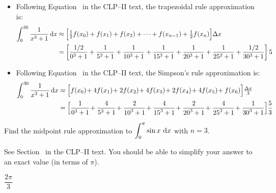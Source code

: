 \begin{solution}
\begin{itemize}
 \item
  Following Equation~ in the CLP--II text, the trapezoidal rule approximation is:
\begin{align*}
\int_0^{30} \frac{1}{x^3+1}\,\mathrm{d}x
&\approx\Big[\tfrac{1}{2} f(x_0)+f(x_1)+f(x_2)+\cdots+ f(x_{n-1})+\tfrac{1}{2} f(x_n)\Big]\Delta x\\
&=\left[
\frac{1/2}{0^3+1}+
\frac{1}{5^3+1}+
\frac{1}{10^3+1}+
\frac{1}{15^3+1}+
\frac{1}{20^3+1}+
\frac{1}{25^3+1}+
\frac{1/2}{30^3+1}
\right]5
\end{align*}

\item Following Equation~ in the CLP--II text, the Simpson's rule approximation is:
\begin{align*}
\int_0^{30} \frac{1}{x^3+1}\,\dee{x}
&\approx\Big[f(x_0)\!+4f(x_1)\!+2f(x_2)\!+4f(x_3)\!+2f(x_4)\!+4f(x_{5})\!+ f(x_6)\Big]\tfrac{\De x}{3}\\
&=\Big[\frac{1}{{0}^3+1}\!+\frac{4}{{5}^3+1}\!+\frac{2}{{10}^3+1}\!+\frac{4}{{15}^3+1}\!+\frac{2}{{20}^3+1}\!+\frac{4}{{25}^3+1}\!+ \frac{1}{{30}^3+1}\Big]\frac{5}{3}
\end{align*}

\end{itemize}
\end{solution}


\begin{question}[M121 2012A]\label{prob_s1.11_int2}
Find the midpoint rule approximation to $\displaystyle\int_0^\pi \sin x\ \mathrm{d}x$
with $n = 3$.
\end{question}

\begin{hint}
See Section~ in the
CLP--II text. You should be able to simplify your answer to an exact value (in terms of $\pi$).
\end{hint}

\begin{answer}
$\dfrac{2\pi}{3}$
\end{answer}

